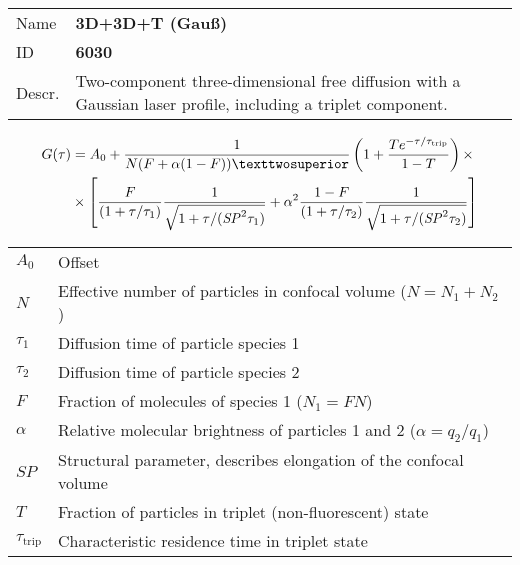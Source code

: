 \noindent \begin{tabular}{lp{}}
Name & \textbf{3D+3D+T (Gauß)} \\ 
ID & \textbf{6030} \\ 
Descr. &  Two-component three-dimensional free diffusion with a Gaussian laser profile, including a triplet component. \\ 
\end{tabular}
\begin{align}
G(\tau) &= A_0 + \frac{1}{N (F + \alpha (1-F))²}  \left(1 + \frac{T e^{-\tau/\tau_\mathrm{trip}}}{1-T}  \right)  \times \\
\notag &\times  \left[ \frac{F}{(1+\tau/\tau_1)}  \frac{1}{\sqrt{1+\tau/(\mathit{SP}^2 \tau_1)}} + \alpha^2 \frac{1-F}{ (1+\tau/\tau_2) }  \frac{1}{\sqrt{1+\tau/(\mathit{SP}^2 \tau_2)}} \right]
\end{align} 
\begin{center}
\begin{tabular}{ll}
$A_0$ & Offset \\ 
$N$ & Effective number of particles in confocal volume ($N = N_1+N_2$) \\ 
$\tau_1$ &  Diffusion time of particle species 1 \\ 
$\tau_2$ &  Diffusion time of particle species 2 \\ 
$F$ & Fraction of molecules of species 1 ($N_1 = F N$) \\
$\alpha$ & Relative molecular brightness of particles 1 and 2 ($ \alpha = q_2/q_1$) \\
$\mathit{SP}$ & Structural parameter, describes elongation of the confocal volume \\
$T$ &  Fraction of particles in triplet (non-fluorescent) state\\ 
$\tau_\mathrm{trip}$ &  Characteristic residence time in triplet state \\ 
\end{tabular}
\end{center}
\vspace{2em}



